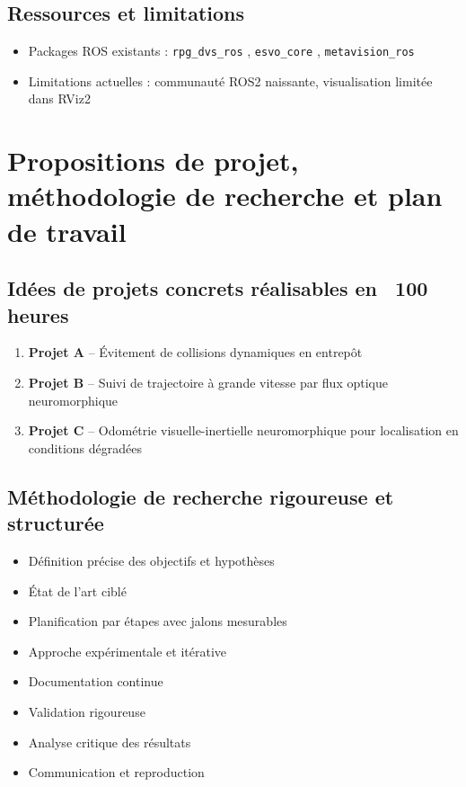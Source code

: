 \subsection{Ressources et limitations}
\begin{itemize}
\item Packages ROS existants : \texttt{rpg\_dvs\_ros} \cite{rpg2024dvs}, \texttt{esvo\_core} \cite{hong2024esvo}, \texttt{metavision\_ros} \cite{prophesee2024metavision}
\item Limitations actuelles : communauté ROS2 naissante, visualisation limitée dans RViz2
\end{itemize}

\section{Propositions de projet, méthodologie de recherche et plan de travail}
\subsection{Idées de projets concrets réalisables en ~100 heures}
\begin{enumerate}
\item \textbf{Projet A} – Évitement de collisions dynamiques en entrepôt
\item \textbf{Projet B} – Suivi de trajectoire à grande vitesse par flux optique neuromorphique
\item \textbf{Projet C} – Odométrie visuelle-inertielle neuromorphique pour localisation en conditions dégradées
\end{enumerate}

\subsection{Méthodologie de recherche rigoureuse et structurée}
\begin{itemize}
\item Définition précise des objectifs et hypothèses
\item État de l'art ciblé
\item Planification par étapes avec jalons mesurables
\item Approche expérimentale et itérative
\item Documentation continue
\item Validation rigoureuse
\item Analyse critique des résultats
\item Communication et reproduction
\end{itemize}

